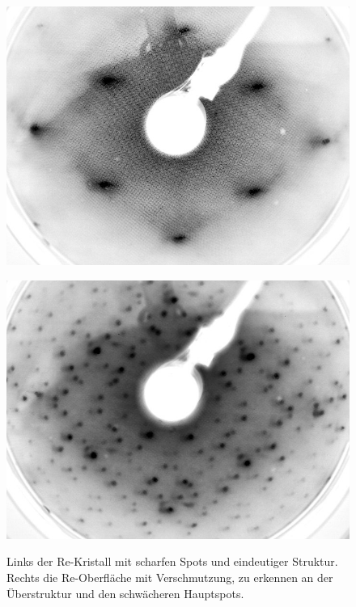 \FloatBarrier


\begin{figure}[htbp]
	\begin{minipage}[b]{0.5\textwidth} 
		\includegraphics[width=\textwidth]{LEED-Bilder/bearbeitet/unbedampft_E207}
		\label{Bild} 
	\end{minipage}
	\hfill
	\begin{minipage}[b]{0.5\textwidth}
		\includegraphics[width=\textwidth]{LEED-Bilder/bearbeitet/unbedampft_E207_MitteKristall.jpg}
		\label{Bild} 
	\end{minipage}
	\caption{Links der Re-Kristall mit scharfen Spots und eindeutiger Struktur. Rechts die
	Re-Oberfläche mit Verschmutzung, zu erkennen an der Überstruktur und den schwächeren Hauptspots.}
\end{figure}

